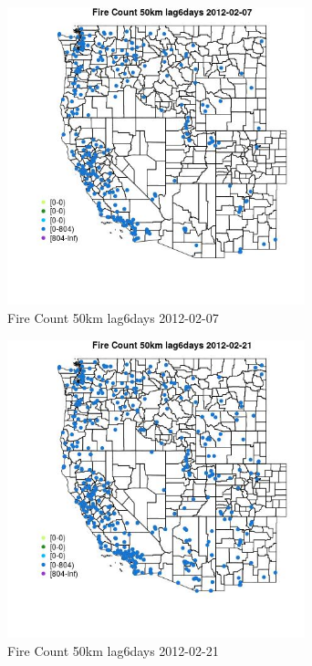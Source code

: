 \begin{figure} 
\centering  
\includegraphics[width=0.77\textwidth]{Code_Outputs/Report_ML_input_PM25_Step4_part_f_de_duplicated_aveswNAs_MapObsFire_Count_50km_lag6days2012-02-07.jpg} 
\caption{\label{fig:Report_ML_input_PM25_Step4_part_f_de_duplicated_aveswNAsMapObsFire_Count_50km_lag6days2012-02-07}Fire Count 50km lag6days 2012-02-07} 
\end{figure} 
 

\begin{figure} 
\centering  
\includegraphics[width=0.77\textwidth]{Code_Outputs/Report_ML_input_PM25_Step4_part_f_de_duplicated_aveswNAs_MapObsFire_Count_50km_lag6days2012-02-21.jpg} 
\caption{\label{fig:Report_ML_input_PM25_Step4_part_f_de_duplicated_aveswNAsMapObsFire_Count_50km_lag6days2012-02-21}Fire Count 50km lag6days 2012-02-21} 
\end{figure} 
 

